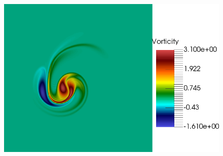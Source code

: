 \begin{figure}[h!]
\includegraphics[scale=0.06]{data/Incompressible_Euler/Snapshots/Full_4.png}\\


\end{figure}
